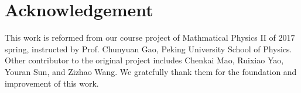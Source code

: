 \documentclass[a4paper,11pt]{article}
\numberwithin{equation}{section}
\numberwithin{table}{section}
\numberwithin{figure}{section}
\begin{document}
	
	\section{Acknowledgement}
	This work is reformed from our course project of Mathmatical Physics II of 2017 spring, instructed by Prof. Chunyuan Gao, Peking University School of Physics. Other contributor to the original project includes Chenkai Mao, Ruixiao Yao, Youran Sun, and Zizhao Wang. We gratefully thank them for the foundation and improvement of this work.
	
	
	

		
\end{document}
